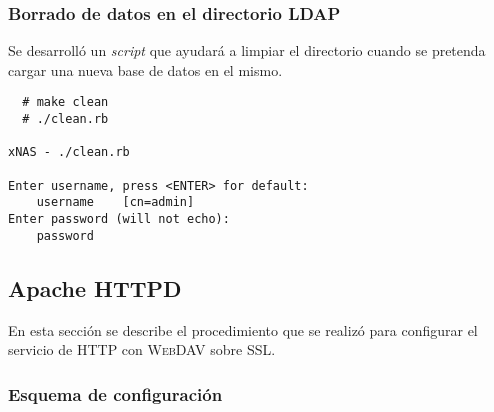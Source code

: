 {
 \begin{table}[H]
 \caption{\textit{Script} de carga de objetos en el directorio}{}
 \label{tab:load-rb}
 \noindent{} %
 \end{table}
}

          \subsubsection {Borrado de datos en el directorio \textsc{LDAP}}

Se desarroll\'{o} un \textit{script} que ayudar\'{a} a limpiar el directorio cuando se pretenda cargar una nueva base de datos en el mismo.

{
\scriptsize
\linespread{1}
\begin{verbatim}
  # make clean
  # ./clean.rb

xNAS - ./clean.rb

Enter username, press <ENTER> for default:
    username	[cn=admin]
Enter password (will not echo):
    password
\end{verbatim}
}

      \subsection {Apache \textsc{HTTPD}}

En esta secci\'{o}n se describe el procedimiento que se realiz\'{o} para configurar el servicio de \textsc{HTTP} con \textsc{WebDAV} sobre \textsc{SSL}.

        \subsubsection {Esquema de configuraci\'{o}n}

